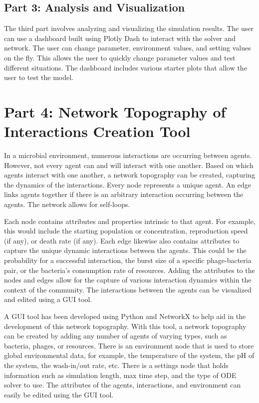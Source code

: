 \subsection{Part 3: Analysis and Visualization}
\label{sec:part3}
The third part involves analyzing and visualizing the simulation results.
The user can use a dashboard built using Plotly Dash to interact with the solver and network.
The user can change parameter, environment values, and setting values on the fly.
This allows the user to quickly change parameter values and test different situations.
The dashboard includes various starter plots that allow the user to test the model.


\section{Part 4: Network Topography of Interactions Creation Tool}
\label{sec:part4}
In a microbial environment, numerous interactions are occurring between agents.
However, not every agent can and will interact with one another.
Based on which agents interact with one another, a network topography can be created, capturing the dynamics of the interactions.
Every node represents a unique agent.
An edge links agents together if there is an arbitrary interaction occurring between the agents. 
The network allows for self-loops.


Each node contains attributes and properties intrinsic to that agent.
For example, this would include the starting population or concentration, reproduction speed (if any), or death rate (if any).
Each edge likewise also contains attributes to capture the unique dynamic interactions between the agents.
This could be the probability for a successful interaction, the burst size of a specific phage-bacteria pair, or the bacteria's consumption rate of resources.
Adding the attributes to the nodes and edges allow for the capture of various interaction dynamics within the context of the community.
The interactions between the agents can be visualized and edited using a GUI tool.


A GUI tool has been developed using Python and NetworkX to help aid in the development of this network topography.
With this tool, a network topography can be created by adding any number of agents of varying types, such as bacteria, phages, or resources.
There is an environment node that is used to store global environmental data, for example, the temperature of the system, the pH of the system, the wash-in/out rate, etc.
There is a settings node that holds information such as simulation length, max time step, and the type of ODE solver to use.
The attributes of the agents, interactions, and environment can easily be edited using the GUI tool.

